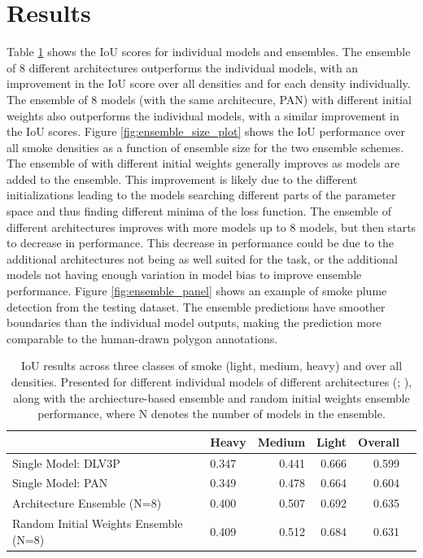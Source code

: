 \documentclass{article}
\begin{document}
\section{Results}
Table \ref{tab:results} shows the IoU scores for individual models and ensembles. The ensemble of 8 different architectures outperforms the individual models, with an improvement in the IoU score over all densities and for each density individually. The ensemble of 8 models (with the same architecure, PAN) with different initial weights also outperforms the individual models, with a similar improvement in the IoU scores. Figure \ref{fig:ensemble_size_plot} shows the IoU performance over all smoke densities as a function of ensemble size for the two ensemble schemes. The ensemble of with different initial weights generally improves as models are added to the ensemble. This improvement is likely due to the different initializations leading to the models searching different parts of the parameter space and thus finding different minima of the loss function. The ensemble of different architectures improves with more models up to 8 models, but then starts to decrease in performance. This decrease in performance could be due to the additional architectures not being as well suited for the task, or the additional models not having enough variation in model bias to improve ensemble performance.
Figure \ref{fig:ensemble_panel} shows an example of smoke plume detection from the testing dataset. The ensemble predictions have smoother boundaries than the individual model outputs, making the prediction more comparable to the human-drawn polygon annotations.
\begin{table}[h]
    \centering
    \begin{tabular}{llrrr>{\bfseries}r}
        \hline
            &   Heavy &   Medium &   Light &   Overall \\
        \hline
         Single Model: DLV3P &   0.347 &     0.441 &  0.666 &      0.599  \\
         Single Model: PAN &  0.349 &     0.478 &  0.664 &      0.604 \\
        Architecture Ensemble (N=8) &   0.400 &     0.507 &  0.692 &      0.635 \\
        Random Initial Weights Ensemble (N=8) &  0.409 &     0.512 &  0.684 &      0.631 \\
         \hline
    \end{tabular}
    \caption{IoU results across three classes of smoke (light, medium, heavy) and over all densities. Presented for different individual models of different architectures (\citep{dlv3p}; \citep{PAN}), along with the archiecture-based ensemble and random initial weights ensemble performance, where N denotes the number of models in the ensemble.}
    \label{tab:results}
    \end{table}
\end{document}
